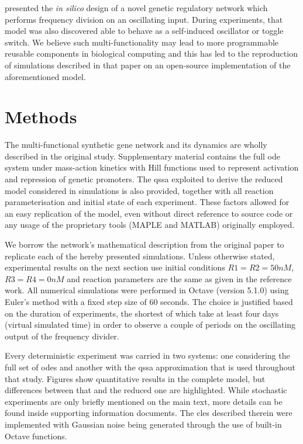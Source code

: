   \citet{multif} presented the \textit{in silico} design of a novel genetic regulatory network which performs frequency division on an oscillating input.
  During experiments, that model was also discovered able to behave as a self-induced oscillator or toggle switch.
  We believe such multi-functionality may lead to more programmable reusable components in biological computing and this has led to the reproduction of simulations described in that paper on an open-source implementation of the aforementioned model.


\section{Methods}

  The multi-functional synthetic gene network and its dynamics are wholly described in the original study.
  Supplementary material contains the full \ac{ode} system under mass-action kinetics with Hill functions used to represent activation and repression of genetic promoters.
  The \ac{qssa} exploited to derive the reduced model considered in simulations is also provided, together with all reaction parameterisation and initial state of each experiment.
  These factors allowed for an easy replication of the model, even without direct reference to source code or any usage of the proprietary tools (MAPLE and MATLAB) originally employed.

  We borrow the network's mathematical description from the original paper to replicate each of the hereby presented simulations.
  Unless otherwise stated, experimental results on the next section use initial conditions $R1 = R2 = 50nM$, $R3 = R4 = 0nM$ and reaction parameters are the same as given in the reference work.
  All numerical simulations were performed in Octave (version 5.1.0) using Euler's method with a fixed step size of $60$ seconds.
  The choice is justified based on the duration of experiments, the shortest of which take at least four days (virtual simulated time) in order to observe a couple of periods on the oscillating output of the frequency divider.

  Every deterministic experiment was carried in two systems: one considering the full set of \ac{ode}s and another with the \ac{qssa} approximation that is used throughout that study.
  Figures show quantitative results in the complete model, but differences between that and the reduced one are highlighted.
  While stochastic experiments are only briefly mentioned on the main text, more details can be found inside supporting information documents.
  The \ac{cles} described therein were implemented with Gaussian noise being generated through the use of built-in Octave functions.

